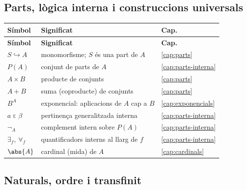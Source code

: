 \subsection*{Parts, lògica interna i construccions universals}

\noindent
\begin{longtable}{@{}p{}p{}p{}@{}}
\toprule
\textbf{Símbol} & \textbf{Significat} & \textbf{Cap.}\\
\midrule
\endfirsthead
\toprule
\textbf{Símbol} & \textbf{Significat} & \textbf{Cap.}\\
\midrule
\endhead
\bottomrule
\endfoot
\(S\hookrightarrow A\) & monomorfisme; \(S\) és una part de \(A\) & \ref{cap:parts}\\
\(P(A)\) & conjunt de parts de \(A\) & \ref{cap:parts-interna}\\
\(A\times B\) & producte de conjunts & \ref{cap:parts}\\
\(A+B\) & suma (coproducte) de conjunts & \ref{cap:parts}\\
\(B^A\) & exponencial: aplicacions de \(A\) cap a \(B\) & \ref{cap:exponencials}\\
\(a\mathrel{\varepsilon}\beta\) & pertinença generalitzada interna & \ref{cap:parts-interna}\\
\(\neg_A\) & complement intern sobre \(P(A)\) & \ref{cap:parts-interna}\\
\(\exists_f,\ \forall_f\) & quantificadors interns al llarg de \(f\) & \ref{cap:parts-interna}\\
\(\abs{A}\) & cardinal (mida) de \(A\) & \ref{cap:cardinals}\\
\end{longtable}

\subsection*{Naturals, ordre i transfinit}

